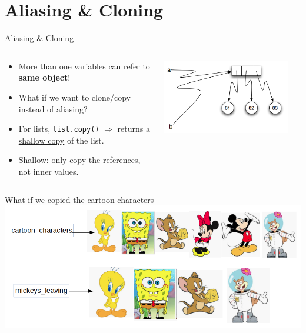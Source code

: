    \section{Aliasing \& Cloning}
    \begin{frame}{Aliasing \& Cloning}
        \Large
        \begin{columns}
            \begin{column}[c]{0.6\textwidth}
                \begin{itemize}
                    \item More than one variables can refer to \textbf{same object}!
                    \item What if we want to clone/copy instead of aliasing?
                    \item For lists, \texttt{list.copy()} $\Rightarrow$ returns a \underline{shallow copy} of the list.
                    \item Shallow: only copy the references, not inner values.
                \end{itemize}
            \end{column}
            \begin{column}[c]{0.4\textwidth}
                \includegraphics[width=0.9\textwidth]{images/aliasing.png}
            \end{column}
        \end{columns}
    \end{frame}

    \begin{frame}{What if we copied the cartoon characters}
        \pause
        \includegraphics[width=\textwidth]{images/list_cartoons/if_we_cloned.png}
    \end{frame}


